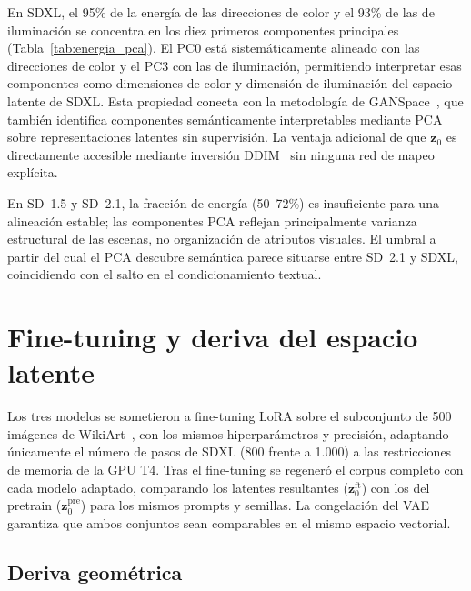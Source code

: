 \documentclass[12pt, a4paper, twoside]{book}
\newcommand{\z}{\mathbf{z}}
\begin{document}
En SDXL, el 95\% de la energía de las direcciones de color y el 93\% de las de iluminación
se concentra en los diez primeros componentes principales (Tabla~\ref{tab:energia_pca}).
El PC0 está sistemáticamente alineado con las direcciones de color y el PC3 con las de
iluminación, permitiendo interpretar esas componentes como dimensiones de color y
dimensión de iluminación del espacio latente de SDXL. Esta propiedad conecta con la metodología 
de GANSpace~\citep{harkonen2020ganspace}, que también identifica componentes semánticamente 
interpretables mediante PCA sobre representaciones latentes sin supervisión. La ventaja adicional
de que $\z_0$ es directamente accesible mediante inversión DDIM~\citep{song2021ddim} sin
ninguna red de mapeo explícita.

En SD~1.5 y SD~2.1, la fracción de energía (50--72\%) es insuficiente para una alineación
estable; las componentes PCA reflejan principalmente varianza estructural de las escenas,
no organización de atributos visuales. El umbral a partir del cual el PCA descubre semántica
parece situarse entre SD~2.1 y SDXL, coincidiendo con el salto en el condicionamiento textual.

\section{Fine-tuning y deriva del espacio latente}
\label{sec:res:finetune}

Los tres modelos se sometieron a fine-tuning LoRA sobre el subconjunto de 500 imágenes de
WikiArt~\citep{saleh2015wikiart}, con los mismos hiperparámetros y precisión, adaptando
únicamente el número de pasos de SDXL (800 frente a 1.000) a las restricciones de
memoria de la GPU T4.
Tras el fine-tuning se regeneró el corpus completo con cada modelo adaptado,
comparando los latentes resultantes ($\z_0^{\text{ft}}$) con los del pretrain ($\z_0^{\text{pre}}$)
para los mismos prompts y semillas. La congelación del VAE garantiza que ambos conjuntos sean
comparables en el mismo espacio vectorial.

\subsection{Deriva geométrica}
\label{subsec:res:deriva_geometrica}
\end{document}
